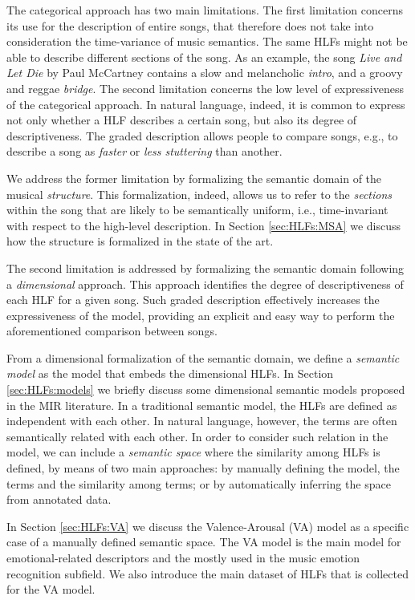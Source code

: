 The categorical approach has two main limitations. The first limitation concerns its use for the description of entire songs, that therefore does not take into consideration the time-variance of music semantics. The same HLFs might not be able to describe different sections of the song. As an example, the song \textit{Live and Let Die} by Paul McCartney contains a slow and melancholic \textit{intro}, and a groovy and reggae \textit{bridge}. The second limitation concerns the low level of expressiveness of the categorical approach. In natural language, indeed, it is common to express not only whether a HLF describes a certain song, but also its degree of descriptiveness. The graded description allows people to compare songs, e.g., to describe a song as \textit{faster} or \textit{less stuttering} than another. 

We address the former limitation by formalizing the semantic domain of the musical \textit{structure}. This formalization, indeed, allows us to refer to the \textit{sections} within the song that are likely to be semantically uniform, i.e., time-invariant with respect to the high-level description. In Section \ref{sec:HLFs:MSA} we discuss how the structure is formalized in the state of the art.

The second limitation is addressed by formalizing the semantic domain following a \textit{dimensional} approach. This approach identifies the degree of descriptiveness of each HLF for a given song. Such graded description effectively increases the expressiveness of the model, providing an explicit and easy way to perform the aforementioned comparison between songs.

From a dimensional formalization of the semantic domain, we define a \textit{semantic model} as the model that embeds the dimensional HLFs. 
In Section \ref{sec:HLFs:models} we briefly discuss some dimensional semantic models proposed in the MIR literature. In a traditional semantic model, the HLFs are defined as independent with each other. In natural language, however, the terms are often semantically related with each other. In order to consider such relation in the model, we can include a \textit{semantic space} where the similarity among HLFs is defined, by means of two main approaches: by manually defining the model, the terms and the similarity among terms; or by automatically inferring the space from annotated data. 

In Section \ref{sec:HLFs:VA} we discuss the Valence-Arousal (VA) model as a specific case of a manually defined semantic space. The VA model is the main model for emotional-related descriptors and the mostly used in the music emotion recognition subfield. We also introduce the main dataset of HLFs that is collected for the VA model.

